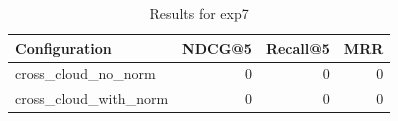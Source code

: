 \begin{table}[htbp]
  \centering
  \caption{Results for exp7}
  \label{tab:exp7}
  \begin{tabular}{lrrr}
    \toprule
    Configuration & NDCG@5 & Recall@5 & MRR \\
    \midrule
    cross_cloud_no_norm & 0 & 0 & 0 \\
    cross_cloud_with_norm & 0 & 0 & 0 \\
    \bottomrule
  \end{tabular}
\end{table}